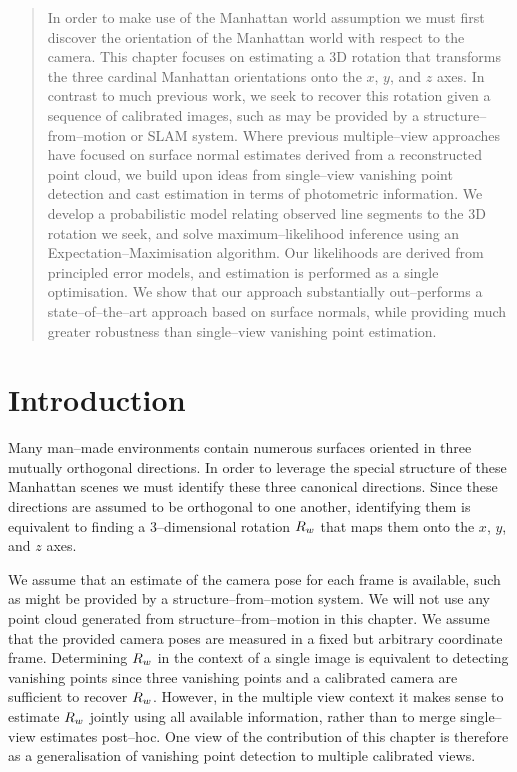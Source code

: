 \begin{quote}
  In order to make use of the Manhattan world assumption we must first
  discover the orientation of the Manhattan world with respect to the
  camera. This chapter focuses on estimating a 3D rotation that
  transforms the three cardinal Manhattan orientations onto the $x$,
  $y$, and $z$ axes. In contrast to much previous work, we seek to
  recover this rotation given a sequence of calibrated images, such as
  may be provided by a structure--from--motion or SLAM system. Where
  previous multiple--view approaches have focused on surface normal
  estimates derived from a reconstructed point cloud, we build upon
  ideas from single--view vanishing point detection and cast
  estimation in terms of photometric information. We develop a
  probabilistic model relating observed line segments to the 3D
  rotation we seek, and solve maximum--likelihood inference using an
  Expectation--Maximisation algorithm. Our likelihoods are derived
  from principled error models, and estimation is performed as a
  single optimisation.  We show that our approach substantially
  out--performs a state--of--the--art approach based on surface
  normals, while providing much greater robustness than single--view
  vanishing point estimation.\footnotemark
\end{quote}


\section{Introduction}

Many man--made environments contain numerous surfaces oriented in
three mutually orthogonal directions. In order to leverage the special
structure of these Manhattan scenes we must identify these three
canonical directions. Since these directions are assumed to be
orthogonal to one another, identifying them is equivalent to finding a
3--dimensional rotation $\SceneR$ that maps them onto the $x$, $y$,
and $z$ axes.

We assume that an estimate of the camera pose for each frame is
available, such as might be provided by a structure--from--motion
system. We will not use any point cloud generated from
structure--from--motion in this chapter. We assume that the provided
camera poses are measured in a fixed but arbitrary coordinate
frame. Determining $\SceneR$ in the context of a single
image is equivalent to detecting vanishing points since three
vanishing points and a calibrated camera are sufficient to recover
$\SceneR$. However, in the multiple view context it makes sense to
estimate $\SceneR$ jointly using all available information, rather
than to merge single--view estimates post--hoc. One view of the
contribution of this chapter is therefore as a generalisation of
vanishing point detection to multiple calibrated views.

